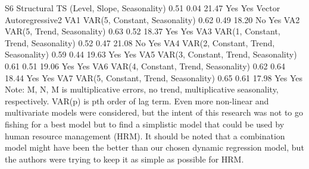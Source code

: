 	S6	Structural TS (Level, Slope, Seasonality) 	0.51	0.04	21.47	Yes	Yes
Vector Autoregressive2	VA1	VAR(5, Constant, Seasonality)	0.62	0.49	18.20	No	Yes
	VA2	VAR(5, Trend, Seasonality)	0.63	0.52	18.37	Yes	Yes
	VA3	VAR(1, Constant, Trend, Seasonality)	0.52	0.47	21.08	No	Yes
	VA4	VAR(2, Constant, Trend, Seasonality)	0.59	0.44	19.63	Yes	Yes
	VA5	VAR(3, Constant, Trend, Seasonality)	0.61	0.51	19.06	Yes	Yes
	VA6	VAR(4, Constant, Trend, Seasonality)	0.62	0.64	18.44	Yes	Yes
	VA7	VAR(5, Constant, Trend, Seasonality)	0.65	0.61	17.98	Yes	Yes
Note:
	M, N, M is multiplicative errors, no trend, multiplicative seasonality, respectively. 
	VAR(p) is pth order of  lag term. 
Even more non-linear and multivariate models were considered, but the intent of this research was not to go fishing for a best model but to find a simplistic model that could be used by human resource management (HRM).  It should be noted that a combination model might have been the better than our chosen dynamic regression model, but the authors were trying to keep it as simple as possible for HRM.

